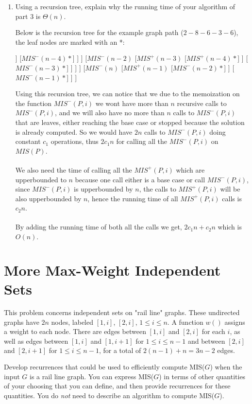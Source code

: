 \documentclass[11pt]{article}
\def\question#1{\red{#1}}
\def\soln#1{\par\blu{#1}} %
\def\blu#1{{\color{blu}#1}}
\def\red#1{{\color{red}#1}}
\begin{document}
\begin{enumerate}
\item \question{Using a recursion tree, explain why the running time of your algorithm of part 3 is $\Theta(n)$.}
\soln{
  Below is the recursion tree for the example graph path ($2-8-6-3-6$), the leaf nodes are marked with 
  an *:
  \begin{center}
    \begin{forest}
      [$MIS(n)$
        [$MIS^+(n)$
          [$MIS^-(n-1)$
            [$MIS^+(n-2)$
              [$MIS^-(n-3)$
                [$MIS^+(n-4)$
                  [$MIS^-(n-5)*$]
                ]
                [$MIS^-(n-4)*$]
              ]
            ]
            [$MIS^-(n-2)$
              [$MIS^+(n-3)$
                [$MIS^+(n-4)*$]
              ]
              [$MIS^-(n-3)*$]
            ]
          ]
        ]
        [$MIS^-(n)$
          [$MIS^+(n-1)$
            [$MIS^-(n-2)*$]
          ]
          [$MIS^-(n-1)*$]
        ]
      ]
    \end{forest}
  \end{center}
  Using this recursion tree, we can notice that we due to the memoization on the function $MIS^-(P,i)$
  we wont have more than $n$ recursive calls to $MIS^-(P,i)$, and we will also have no more than 
  $n$ calls to $MIS^-(P,i)$ that are leaves, either reaching the base case or stopped because the 
  solution is already computed. So we would have $2n$ calls to $MIS^-(P,i)$ doing constant $c_1$ operations, 
  thus $2c_1n$ for calling all the $MIS^-(P,i)$ on $MIS(P)$. \\ \\
  We also need the time of calling all the $MIS^+(P,i)$ which are upperbounded to $n$ because one 
  call either is a base case or call $MIS^-(P,i)$, since $MIS^-(P,i)$ is upperbounded by $n$, the 
  calls to $MIS^+(P,i)$ will be also upperbounded by $n$, hence the running time of all 
  $MIS^+(P,i)$ calls is $c_2n$. \\ \\
  By adding the running time of both all the calls we get, $2c_1n + c_2n$ which is $O(n)$.
}
\end{enumerate}

\section{More Max-Weight Independent Sets}
\label{sec-5}
This problem concerns independent sets on "rail line" graphs. These
undirected graphs have $2n$ nodes, labeled $[1,i]$, $[2,i]$, $1 \le i
\le n$. A function $w()$ assigns a weight to each node. There are
edges between $[1,i]$ and $[2,i]$ for each $i$, as well as edges
between $[1,i]$ and $[1,i+1]$ for $1 \le i \le n-1$ and between
$[2,i]$ and $[2,i+1]$ for $1 \le i \le n-1$, for a total of $2(n-1) +
n = 3n-2$ edges.

\question{Develop recurrences that could be used to efficiently compute MIS($G$) when the input $G$ is a rail line graph.} You
can express MIS($G$) in terms of other quantities of your
choosing that you can define, and then provide recurrences for these quantities.
You do \emph{not} need to describe an algorithm to compute MIS($G$).
\end{document}
